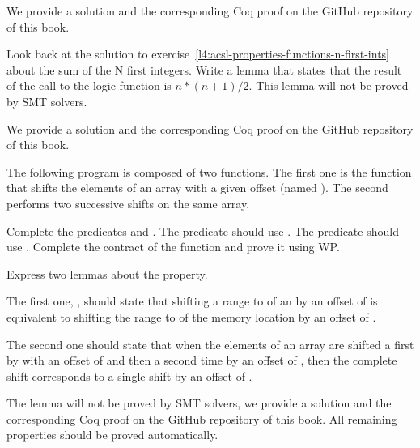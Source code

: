 We provide a solution and the corresponding Coq proof on the GitHub repository
of this book.


\label{l4:acsl-properties-lemmas-n-first-ints}

Look back at the solution to
exercise~\ref{l4:acsl-properties-functions-n-first-ints} about the sum of the
N first integers. Write a lemma that states that the result of the call to the
logic function is $n*(n+1)/2$. This lemma will not be proved by SMT solvers.


We provide a solution and the corresponding Coq proof on the GitHub repository
of this book.


\label{l4:acsl-properties-lemmas-shift-trans}


The following program is composed of two functions. The first one is the
 function that shifts the elements of an array with a
given offset (named ). The second performs two successive
shifts on the same array.




Complete the predicates  and .
The  predicate should use .
The  predicate should use .
Complete the contract of the  function and prove
it using WP.


Express two lemmas about the  property.


The first one, , should state that shifting a range
 to  of an  by an
offset of  is equivalent to shifting the range  to
 of the memory location  by an offset
of .



The second one should state that when the elements of an array are shifted a
first by with an offset of  and then a second time by an offset
of , then the complete shift corresponds to a single shift by an
offset of .



The lemma  will not be proved by SMT solvers, we provide
a solution and the corresponding Coq proof on the GitHub repository of this
book. All remaining properties should be proved automatically.



